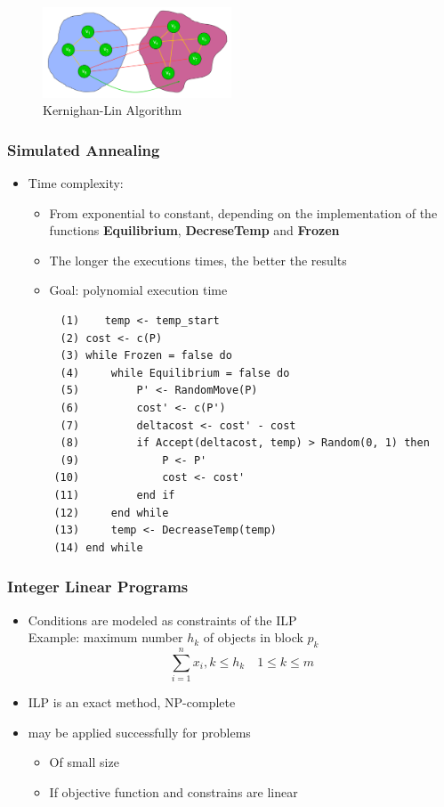 \begin{figure}[h]
	\begin{center}
		\includegraphics[width=0.5\textwidth]{images/Kernighan-Lin.png}
		\caption{Kernighan-Lin Algorithm}
		\label{fig:Kernighan-Lin}
	\end{center}
\end{figure}

\subsubsection{Simulated Annealing}
\begin{itemize}
	\item Time complexity:
\begin{itemize}
	\item From exponential to constant, depending on the implementation of the functions \textbf{Equilibrium}, \textbf{DecreseTemp} and \textbf{Frozen}
	\item The longer the executions times, the better the results
	\item Goal: polynomial execution time
\end{itemize}
\begin{verbatim}
	 (1)	temp <- temp_start
	 (2) cost <- c(P)
	 (3) while Frozen = false do
	 (4)     while Equilibrium = false do
	 (5)         P' <- RandomMove(P)
	 (6)         cost' <- c(P')
	 (7)         deltacost <- cost' - cost
	 (8)         if Accept(deltacost, temp) > Random(0, 1) then
	 (9)             P <- P'
	(10)             cost <- cost'
	(11)         end if
	(12)     end while
	(13)     temp <- DecreaseTemp(temp)
	(14) end while
\end{verbatim}
\end{itemize}

\subsubsection{Integer Linear Programs}
\begin{itemize}
	\item Conditions are modeled as constraints of the ILP \\
			Example: maximum number $h_k$ of objects in block $p_k$
			$$
				\sum_{i=1}^nx_i,k\leq h_k\quad1\leq k\leq m
			$$ 
	\item ILP is an exact method, NP-complete
	\item may be applied successfully for problems
\begin{itemize}
	\item Of small size
	\item If objective function and constrains are linear
\end{itemize}
\end{itemize}

